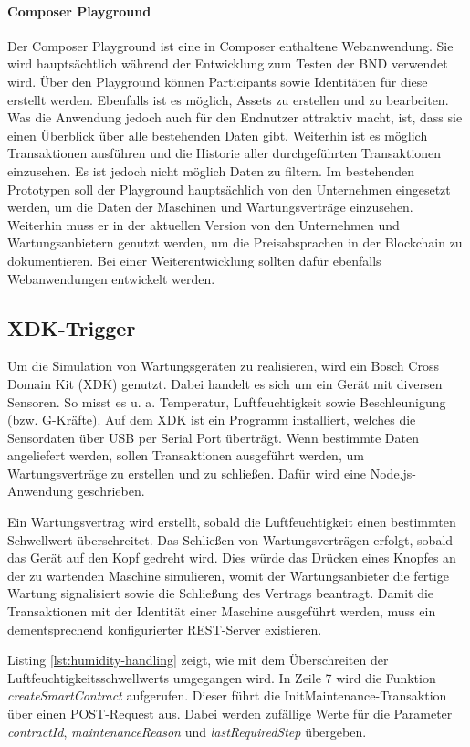 \paragraph{Composer Playground}
Der Composer Playground ist eine in Composer enthaltene Webanwendung. Sie wird hauptsächtlich während der Entwicklung zum Testen der \acs{BND} verwendet wird. Über den Playground können Participants sowie Identitäten für diese erstellt werden. Ebenfalls ist es möglich, Assets zu erstellen und zu bearbeiten. Was die Anwendung jedoch auch für den Endnutzer attraktiv macht, ist, dass sie einen Überblick über alle bestehenden Daten gibt. Weiterhin ist es möglich Transaktionen ausführen und die Historie aller durchgeführten Transaktionen einzusehen. Es ist jedoch nicht möglich Daten zu filtern. Im bestehenden Prototypen soll der Playground hauptsächlich von den Unternehmen eingesetzt werden, um die Daten der Maschinen und Wartungsverträge einzusehen. Weiterhin muss er in der aktuellen Version von den Unternehmen und Wartungsanbietern genutzt werden, um die Preisabsprachen in der Blockchain zu dokumentieren. Bei einer Weiterentwicklung sollten dafür ebenfalls Webanwendungen entwickelt werden.

\subsection{XDK-Trigger}
Um die Simulation von Wartungsgeräten zu realisieren, wird ein Bosch Cross Domain Kit (XDK) genutzt. Dabei handelt es sich um ein Gerät mit diversen Sensoren. So misst es u. a. Temperatur, Luftfeuchtigkeit sowie Beschleunigung (bzw. G-Kräfte). Auf dem XDK ist ein Programm installiert, welches die Sensordaten über USB per Serial Port überträgt. Wenn bestimmte Daten angeliefert werden, sollen Transaktionen ausgeführt werden, um Wartungsverträge zu erstellen und zu schließen. Dafür wird eine Node.js-Anwendung geschrieben.

Ein Wartungsvertrag wird erstellt, sobald die Luftfeuchtigkeit einen bestimmten Schwellwert überschreitet. Das Schließen von Wartungsverträgen erfolgt, sobald das Gerät auf den Kopf gedreht wird. Dies würde das Drücken eines Knopfes an der zu wartenden Maschine simulieren, womit der Wartungsanbieter die fertige Wartung signalisiert sowie die Schließung des Vertrags beantragt. Damit die Transaktionen mit der Identität einer Maschine ausgeführt werden, muss ein dementsprechend konfigurierter REST-Server existieren. 

Listing \ref{lst:humidity-handling} zeigt, wie mit dem Überschreiten der Luftfeuchtigkeitsschwellwerts umgegangen wird. In Zeile 7 wird die Funktion \textit{createSmartContract} aufgerufen. Dieser führt die InitMaintenance-Transaktion über einen POST-Request aus. Dabei werden zufällige Werte für die Parameter \textit{contractId}, \textit{maintenanceReason} und \textit{lastRequiredStep} übergeben.

